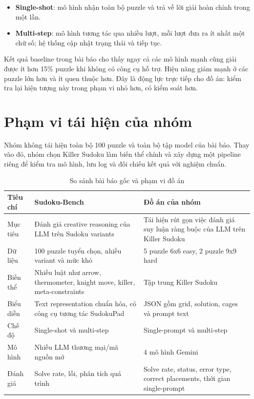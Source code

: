 \documentclass[12pt,a4paper,oneside]{report}
\newlength{\manualparindent}
\newcommand{\manualindent}{\hspace*{\manualparindent}}
\begin{document}
\begin{itemize}
  \item \textbf{Single-shot}: mô hình nhận toàn bộ puzzle và trả về lời giải hoàn chỉnh trong một lần.
  \item \textbf{Multi-step}: mô hình tương tác qua nhiều lượt, mỗi lượt đưa ra ít nhất một chữ số; hệ thống cập nhật trạng thái và tiếp tục.
\end{itemize}

Kết quả baseline trong bài báo cho thấy ngay cả các mô hình mạnh cũng giải được ít hơn 15\% puzzle khi không có công cụ hỗ trợ. Hiệu năng giảm mạnh ở các puzzle lớn hơn và ít quen thuộc hơn. Đây là động lực trực tiếp cho đồ án: kiểm tra lại hiện tượng này trong phạm vi nhỏ hơn, có kiểm soát hơn.

\section{Phạm vi tái hiện của nhóm}

\manualindent%
Nhóm không tái hiện toàn bộ 100 puzzle và toàn bộ tập model của bài báo. Thay vào đó, nhóm chọn Killer Sudoku làm biến thể chính và xây dựng một pipeline riêng để kiểm tra mô hình, lưu log và đối chiếu kết quả với nghiệm chuẩn.

\begin{table}[H]
  \centering
  \caption{So sánh bài báo gốc và phạm vi đồ án}
  \small
  \begin{tabularx}{\textwidth}{p{3.1cm}XX}
    \toprule
    Tiêu chí & Sudoku-Bench & Đồ án của nhóm \\
    \midrule
    Mục tiêu & Đánh giá creative reasoning của LLM trên Sudoku variants & Tái hiện rút gọn việc đánh giá suy luận ràng buộc của LLM trên Killer Sudoku \\
    Dữ liệu & 100 puzzle tuyển chọn, nhiều variant và mức khó & 5 puzzle 6x6 easy, 2 puzzle 9x9 hard \\
    Biến thể & Nhiều luật như arrow, thermometer, knight move, killer, meta-constraints & Tập trung Killer Sudoku \\
    Biểu diễn & Text representation chuẩn hóa, có công cụ tương tác SudokuPad & JSON gồm grid, solution, cages và prompt text \\
    Chế độ & Single-shot và multi-step & Single-prompt và multi-step \\
    Mô hình & Nhiều LLM thương mại/mã nguồn mở & 4 mô hình Gemini \\
    Đánh giá & Solve rate, lỗi, phân tích quá trình & Solve rate, status, error type, correct placements, thời gian single-prompt \\
    \bottomrule
  \end{tabularx}
\end{table}
\end{document}
